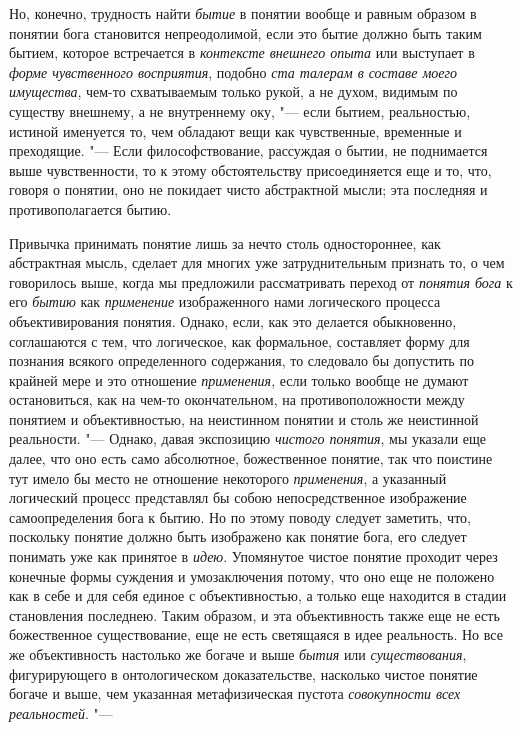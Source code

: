 {{Но, конечно, трудность найти {\em бытие} в понятии
вообще и равным образом в понятии бога становится непреодолимой, если это
бытие должно быть таким бытием, которое встречается в
{\em контексте внешнего опыта} или выступает в {\em форме
чувственного восприятия}, подобно {\em ста талерам в составе моего
имущества}, чем-то схватываемым только рукой, а не духом,
видимым по существу внешнему, а не внутреннему оку, "--- если
бытием, реальностью, истиной именуется то, чем обладают вещи как
чувственные, временные и преходящие. "--- Если
философствование, рассуждая о бытии, не поднимается выше чувственности, то
к этому обстоятельству присоединяется еще и то, что, говоря о понятии, оно
не покидает чисто абстрактной мысли; эта последняя и противополагается бытию.

Привычка принимать понятие лишь за нечто столь одностороннее,
как абстрактная мысль, сделает для многих уже затруднительным признать то,
о чем говорилось выше, когда мы предложили рассматривать переход от
{\em понятия бога} к его {\em бытию} как {\em применение}
изображенного нами логического процесса объективирования
понятия. Однако, если, как это делается обыкновенно, соглашаются с тем, что
логическое, как формальное, составляет форму для познания всякого
определенного содержания, то следовало бы допустить по крайней мере и это
отношение {\em применения},
если только вообще не думают остановиться, как на чем-то
окончательном, на противоположности между понятием и объективностью, на
неистинном понятии и столь же неистинной реальности. "---
Однако, давая экспозицию {\em чистого понятия}, мы
указали еще далее, что оно есть само абсолютное, божественное понятие, так
что поистине тут имело бы место не отношение некоторого {\em применения}, а
указанный логический процесс представлял бы собою непосредственное
изображение самоопределения бога к бытию. Но по этому поводу следует
заметить, что, поскольку понятие должно быть изображено как понятие бога,
его следует понимать уже как принятое в {\em идею}. Упомянутое
чистое понятие проходит через конечные формы суждения и
умозаключения потому, что оно еще не положено как в себе и для себя единое
с объективностью, а только еще находится в стадии становления последнею.
Таким образом, и эта объективность также еще не есть божественное
существование, еще не есть светящаяся в идее реальность. Но все же
объективность настолько же богаче и выше {\em бытия} или {\em существования},
фигурирующего в онтологическом доказательстве, насколько
чистое понятие богаче и выше, чем указанная метафизическая пустота
{\em совокупности всех реальностей}. "---
}}
